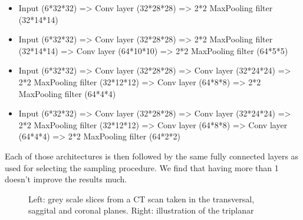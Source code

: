 \begin{itemize}
	\item Input (6*32*32) => Conv layer (32*28*28) => 2*2 MaxPooling filter (32*14*14) 
	\item Input (6*32*32) => Conv layer (32*28*28) => 2*2 MaxPooling filter (32*14*14) => Conv layer (64*10*10) => 2*2 MaxPooling filter (64*5*5)
	\item Input (6*32*32) => Conv layer (32*28*28) => Conv layer (32*24*24) => 2*2 MaxPooling filter (32*12*12) => Conv layer (64*8*8) => 2*2 MaxPooling filter (64*4*4)
	\item Input (6*32*32) => Conv layer (32*28*28) => Conv layer (32*24*24) => 2*2 MaxPooling filter (32*12*12) => Conv layer (64*8*8) => Conv layer (64*4*4) => 2*2 MaxPooling filter (64*2*2)
\end{itemize}

Each of those architectures is then followed by the same fully connected layers as used for selecting the sampling procedure. We find that having more than 1 doesn't improve the results much. 

\begin{figure}
\centering
\begin{minipage}{0.45\textwidth}
\centering
{}
\end{minipage}\hfill
\hspace{-1cm}
\begin{minipage}{0.45\textwidth}
\centering
{}
\end{minipage}
\caption{Left: grey scale slices from a CT scan taken in the transversal, saggital and coronal planes. Right: illustration of the triplanar}
\end{figure}

